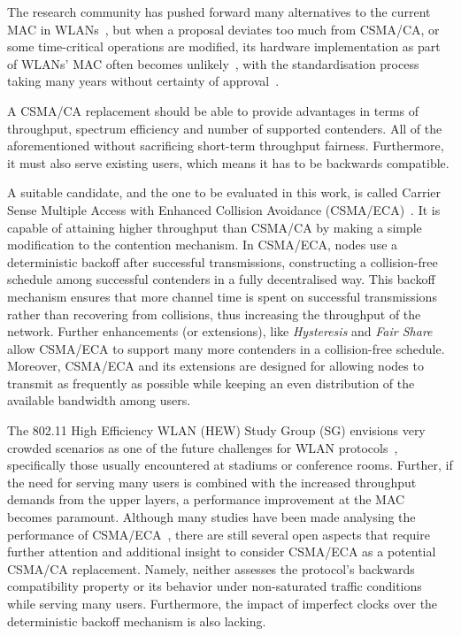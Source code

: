 \documentclass[a4paper,journal]{IEEEtran}
\begin{document}
The research community has pushed forward many alternatives to the current MAC in WLANs~\cite{bharghavan1994map,wang2004ncr,cali2000dti,lopez-toledo2006aoi,
barcelo2008lba,bellalta2009vtc,HE,CSMA_ECA,L_MAC2,hui2011epp,barcelo2011tcf}, but when a proposal deviates too much from CSMA/CA, or some time-critical operations are modified, its hardware implementation as part of WLANs' MAC often becomes unlikely~\cite{WMP}, with the standardisation process taking many years without certainty of approval~\cite{perahia2008ieee}. 

A CSMA/CA replacement should be able to provide advantages in terms of throughput, spectrum efficiency and number of supported contenders. All of the aforementioned without sacrificing short-term throughput fairness. Furthermore, it must also serve existing users, which means it has to be backwards compatible.

A suitable candidate, and the one to be evaluated in this work, is called Carrier Sense Multiple Access with Enhanced Collision Avoidance (CSMA/ECA)~\cite{barcelo2008lba}. It is capable of attaining higher throughput than CSMA/CA by making a simple modification to the contention mechanism. In CSMA/ECA, nodes use a deterministic backoff after successful transmissions, constructing a collision-free schedule among successful contenders in a fully decentralised way. This backoff mechanism ensures that more channel time is spent on successful transmissions rather than recovering from collisions, thus increasing the throughput of the network. Further enhancements (or extensions), like \emph{Hysteresis} and \emph{Fair Share}~\cite{research2standards} allow CSMA/ECA to support many more contenders in a collision-free schedule. Moreover, CSMA/ECA and its extensions are designed for allowing nodes to transmit as frequently as possible while keeping an even distribution of the available bandwidth among users.

The 802.11 High Efficiency WLAN (HEW) Study Group (SG) envisions very crowded scenarios as one of the future challenges for WLAN protocols~\cite{HEW-scenarios}, specifically those usually encountered at stadiums or conference rooms. Further, if the need for serving many users is combined with the increased throughput demands from the upper layers, a performance improvement at the MAC becomes paramount. Although many studies have been made analysing the performance of CSMA/ECA~\cite{barcelo2008lba,research2standards,bellalta2009vtc,E2CA_performance}, there are still several open aspects that require further attention and additional insight to consider CSMA/ECA as a potential CSMA/CA replacement. Namely, neither assesses the protocol's backwards compatibility property or its behavior under non-saturated traffic conditions while serving many users. Furthermore, the impact of imperfect clocks over the deterministic backoff mechanism is also lacking.
\end{document}
